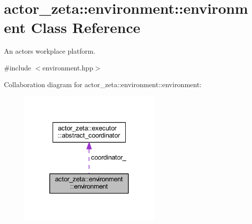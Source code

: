\hypertarget{classactor__zeta_1_1environment_1_1environment}{}\section{actor\+\_\+zeta\+:\+:environment\+:\+:environment Class Reference}
\label{classactor__zeta_1_1environment_1_1environment}


An actors workplace platform.  




{\ttfamily \#include $<$environment.\+hpp$>$}



Collaboration diagram for actor\+\_\+zeta\+:\+:environment\+:\+:environment\+:\nopagebreak
\begin{figure}[H]
\begin{center}
\leavevmode
\includegraphics[width=200pt]{classactor__zeta_1_1environment_1_1environment__coll__graph}
\end{center}
\end{figure}
